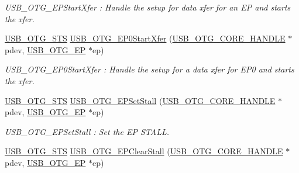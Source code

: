 \begin{DoxyCompactItemize}
\begin{DoxyCompactList}\small\item\em U\-S\-B\-\_\-\-O\-T\-G\-\_\-\-E\-P\-Start\-Xfer \-: Handle the setup for data xfer for an E\-P and starts the xfer. \end{DoxyCompactList}\item 
\hyperlink{group___u_s_b___c_o_r_e___exported___types_ga8b6504b9af0662f17515795db0f9c8ed}{U\-S\-B\-\_\-\-O\-T\-G\-\_\-\-S\-T\-S} \hyperlink{group___u_s_b___c_o_r_e___private___functions_ga83dd7875670235649b054674bfeba616}{U\-S\-B\-\_\-\-O\-T\-G\-\_\-\-E\-P0\-Start\-Xfer} (\hyperlink{group___u_s_b___c_o_r_e___exported___types_gaf76054c11eb8a3367907aad7ae700e80}{U\-S\-B\-\_\-\-O\-T\-G\-\_\-\-C\-O\-R\-E\-\_\-\-H\-A\-N\-D\-L\-E} $\ast$pdev, \hyperlink{group___u_s_b___c_o_r_e___exported___types_gad1c65925021e8dac88858e10bb2a7eea}{U\-S\-B\-\_\-\-O\-T\-G\-\_\-\-E\-P} $\ast$ep)
\begin{DoxyCompactList}\small\item\em U\-S\-B\-\_\-\-O\-T\-G\-\_\-\-E\-P0\-Start\-Xfer \-: Handle the setup for a data xfer for E\-P0 and starts the xfer. \end{DoxyCompactList}\item 
\hyperlink{group___u_s_b___c_o_r_e___exported___types_ga8b6504b9af0662f17515795db0f9c8ed}{U\-S\-B\-\_\-\-O\-T\-G\-\_\-\-S\-T\-S} \hyperlink{group___u_s_b___c_o_r_e___private___functions_ga92d70fb5830b52c03bc218b3ad3cdef4}{U\-S\-B\-\_\-\-O\-T\-G\-\_\-\-E\-P\-Set\-Stall} (\hyperlink{group___u_s_b___c_o_r_e___exported___types_gaf76054c11eb8a3367907aad7ae700e80}{U\-S\-B\-\_\-\-O\-T\-G\-\_\-\-C\-O\-R\-E\-\_\-\-H\-A\-N\-D\-L\-E} $\ast$pdev, \hyperlink{group___u_s_b___c_o_r_e___exported___types_gad1c65925021e8dac88858e10bb2a7eea}{U\-S\-B\-\_\-\-O\-T\-G\-\_\-\-E\-P} $\ast$ep)
\begin{DoxyCompactList}\small\item\em U\-S\-B\-\_\-\-O\-T\-G\-\_\-\-E\-P\-Set\-Stall \-: Set the E\-P S\-T\-A\-L\-L. \end{DoxyCompactList}\item 
\hyperlink{group___u_s_b___c_o_r_e___exported___types_ga8b6504b9af0662f17515795db0f9c8ed}{U\-S\-B\-\_\-\-O\-T\-G\-\_\-\-S\-T\-S} \hyperlink{group___u_s_b___c_o_r_e___private___functions_gac6e4d998ca2bcc13026de440fdc7ab2d}{U\-S\-B\-\_\-\-O\-T\-G\-\_\-\-E\-P\-Clear\-Stall} (\hyperlink{group___u_s_b___c_o_r_e___exported___types_gaf76054c11eb8a3367907aad7ae700e80}{U\-S\-B\-\_\-\-O\-T\-G\-\_\-\-C\-O\-R\-E\-\_\-\-H\-A\-N\-D\-L\-E} $\ast$pdev, \hyperlink{group___u_s_b___c_o_r_e___exported___types_gad1c65925021e8dac88858e10bb2a7eea}{U\-S\-B\-\_\-\-O\-T\-G\-\_\-\-E\-P} $\ast$ep)

\end{DoxyCompactItemize}
